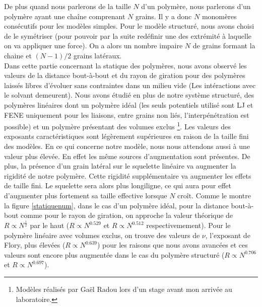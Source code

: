 \documentclass[a4paper,11pt]{article}
\begin{document}
De plus quand nous parlerons de la taille $N$ d'un polymère, nous parlerons d'un polymère ayant une chaîne comprenant $N$ grains. Il y a donc $N$ monomères consécutifs pour les modèles simples. Pour le modèle structuré, nous avons choisi de le symétriser (pour pouvoir par la suite redéfinir une des extrémité à laquelle on va appliquer une force). On a alors un nombre impaire $N$ de grains formant la chaine et $(N-1)/2$ grains latéraux.\\


Dans cette partie concernant la statique des polymères, nous avons observé les valeurs de la distance bout-à-bout et du rayon de giration pour des polymères laissés libres d'évoluer sans contraintes dans un milieu vide (Les intéractions avec le solvant demeurent). Nous avons étudié en plus de notre système structuré, des polymères linéaires dont un polymère idéal (les seuls potentiels utilisé sont LJ et FENE uniquement pour les liaisons, entre grains non liés, l'interpénétration est possible) et un polymère présentant des volumes exclus \footnote{Modèles réalisés par Gaël Radou lors d'un stage avant mon arrivée au laboratoire.}. Les valeurs des exposants caractéristiques sont légèrement supérieures en raison de la taille fini des modèles. En ce qui concerne notre modèle, nous nous attendons aussi à une valeur plus élevée. En effet les même sources d'augmentation sont présentes. De plus, la présence d'un grain latéral sur le squelette linéaire va augmenter la rigidité de notre polymère. Cette rigidité supplémentaire va augmenter les effets de taille fini. Le squelette sera alors plus longiligne, ce qui aura pour effet d'augmenter plus fortement sa taille effective lorsque $N$ croît. Comme le montre la figure  \ref{statiquenum}, dans le cas d'un polymère idéal, pour la distance bout-à-bout comme pour le rayon de giration, on approche la valeur théorique de $R\propto N^\frac{1}{2}$ par le haut ($R\propto N^{0.529}$ et $R\propto N^{0.512}$ respectivemement). Pour le polymère linéaire avec volumes exclus, on trouve des valeurs de $\nu$, l'exposant de Flory, plus élevées ($R \propto N^{0.639}$) pour les raisons que nous avons avancées et ces valeurs sont encore plus augmentée dans le cas du polymère structuré ($R\propto N^{0.706}$ et $R \propto N^{0.697}$). \\
\end{document}
